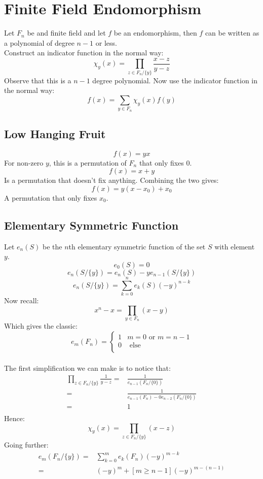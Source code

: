 
\section{Finite Field Endomorphism}
Let $F_n$ be and finite field and let $f$ be an endomorphism,
then $f$ can be written as a polynomial of degree $n-1$ or less.
\\

Construct an indicator function in the normal way:
\[\chi_y(x) = \prod_{z\in F_n/\{y\}}\frac{x-z}{y-z}\]
Observe that this is a $n-1$ degree polynomial.
Now use the indicator function in the normal way:
\[f(x) = \sum_{y\in F_n}\chi_y(x)f(y)\]

\subsection{Low Hanging Fruit}
\[f(x) = yx\]
For non-zero $y$,
this is a permutation of $F_n$ that only fixes $0$.
\[f(x) = x+y\]
Is a permutation that doesn't fix anything.
Combining the two gives:
\[f(x) = y(x-x_0)+x_0\]
A permutation that only fixes $x_0$.

\subsection{Elementary Symmetric Function}
Let $e_n(S)$ be the $n$th elementary symmetric function of the set $S$ with element $y$.
\[e_0(S) = 0\]
\[e_n(S/\{y\})=e_n(S)-ye_{n-1}(S/\{y\})\]
\[e_n(S/\{y\})=\sum_{k=0}^ne_k(S)(-y)^{n-k}\]
Now recall:
\[x^{n}-x = \prod_{y\in F_n}(x-y)\]
Which gives the classic:
\[e_m(F_n) = \begin{cases} 1 & m = 0\text{ or } m = n-1\\ 0 & \text{ else}\\\end{cases}\]
\\

The first simplification we can make is to notice that:
\begin{equation*}
\begin{aligned}
\prod_{z\in F_n/\{y\}}\frac{1}{y-z} =& \frac{1}{e_{n-1}(F_n/\{0\})}\\
=& \frac{1}{e_{n-1}(F_n)-0e_{n-2}(F_n/\{0\})}\\
=&1\\
\end{aligned}
\end{equation*}
Hence:
\[\chi_y(x) = \prod_{z\in F_n/\{y\}}(x-z)\]
Going further:
\begin{equation*}
\begin{aligned}
e_m(F_n/\{y\})=&\sum_{k=0}^me_k(F_n)(-y)^{m-k}\\
=&(-y)^m+[m\geq n-1](-y)^{m-(n-1)}\\
\end{aligned}
\end{equation*}

